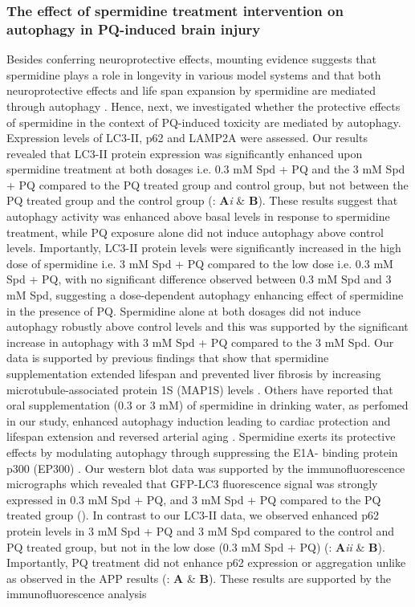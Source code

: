 \subsubsection{The effect of spermidine treatment intervention on autophagy in PQ-induced brain injury}
Besides conferring neuroprotective effects, mounting evidence suggests that spermidine plays a role in longevity in various model systems \citep{Eisenberg2009,Garcia-Prat2016,Minois2012,Morselli2011,Pietrocola2015} and that both neuroprotective effects and life span expansion by spermidine are mediated through autophagy \citep{Eisenberg2009,Gupta2016,Gupta2013,Minois2012,Yue2017}. Hence, next, we investigated whether the protective effects of spermidine in the context of PQ-induced toxicity are mediated by autophagy. Expression levels of LC3-II, p62 and LAMP2A were assessed. Our results revealed that LC3-II protein expression was significantly enhanced upon spermidine treatment at both dosages i.e. 0.3 mM Spd + PQ and the 3 mM Spd + PQ compared to the PQ treated group and control group, but not between the PQ treated group and the control group (: \textbf{A}\textit{i} \& \textbf{B}). These results suggest that autophagy activity was enhanced above basal levels in response to spermidine treatment, while PQ exposure alone did not induce autophagy above control levels. Importantly, LC3-II protein levels were significantly increased in the high dose of spermidine i.e. 3 mM Spd + PQ compared to the low dose i.e. 0.3 mM Spd + PQ, with no significant difference observed between 0.3 mM Spd and 3 mM Spd, suggesting a dose-dependent autophagy enhancing effect of spermidine in the presence of PQ. Spermidine alone at both dosages did not induce autophagy robustly above control levels and this was supported by the significant increase in autophagy with 3 mM Spd + PQ compared to the 3 mM Spd. Our data is supported by previous findings that show that spermidine supplementation extended lifespan and prevented liver fibrosis by increasing microtubule-associated protein 1S (MAP1S) levels \citep{Yue2017}. Others have reported that oral supplementation (0.3 or 3 mM) of spermidine in drinking water, as perfomed in our study, enhanced autophagy induction leading to cardiac protection and lifespan extension \citep{Eisenberg2016a} and reversed arterial aging \citep{LaRocca2013}. Spermidine exerts its protective effects by modulating autophagy through suppressing the E1A- binding protein p300 (EP300) \citep{Pietrocola2015}. Our western blot data was supported by the immunofluorescence micrographs which revealed that GFP-LC3 fluorescence signal was strongly expressed in 0.3 mM Spd + PQ, and 3 mM Spd + PQ compared to the PQ treated group (). In contrast to our LC3-II data, we observed enhanced p62 protein levels in 3 mM Spd + PQ and 3 mM Spd compared to the control and PQ treated group, but not in the low dose (0.3 mM Spd + PQ) (: \textbf{A}\textit{ii} \& \textbf{B}). Importantly, PQ treatment did not enhance p62 expression or aggregation unlike as observed in the APP results (: \textbf{A} \& \textbf{B}). These results are supported by the immunofluorescence analysis 